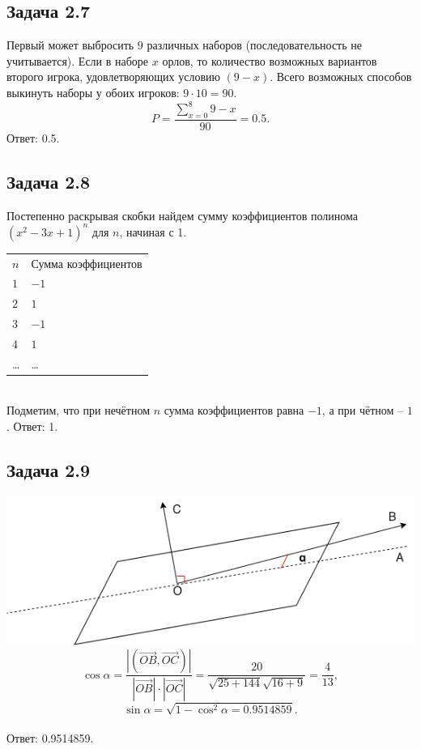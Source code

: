 \documentclass[12pt]{article}
\begin{document}
\subsection*{Задача 2.7}
Первый может выбросить $9$ различных наборов (последовательность не учитывается). Если в наборе $x$ орлов, то количество возможных вариантов второго игрока, удовлетворяющих условию $(9 - x)$. Всего возможных способов выкинуть наборы у обоих игроков: $9 \cdot 10 = 90$. $$P = \frac{\sum\limits_{x=0}^8{9-x}}{90}=0.5.$$
Ответ: 0.5.  
\subsection*{Задача 2.8}
Постепенно раскрывая скобки найдем сумму коэффициентов полинома $(x^2-3x+1)^n$ для $n$, начиная с 1.\\
\begin{tabular}{l l}
    $n$ & Сумма коэффициентов \\
    $1$ & $-1$  \\
    $2$ & $1$  \\
    $3$ & $-1$  \\
    $4$ & $1$  \\
    \dots & \dots \\
\end{tabular}\\
Подметим, что при нечётном $n$ сумма коэффициентов равна $-1$, а при чётном -- $1$. Ответ: 1.

\subsection*{Задача 2.9}
\includegraphics{math29}\\
$$\cos\alpha = \frac{|(\vec{OB}, \vec{OC})|}{|\vec{OB}|\cdot|\vec{OC}|} = \frac{20}{\sqrt{25+144}\sqrt{16+9}}= \frac{4}{13},$$
$$\sin\alpha = \sqrt{1 - \cos^2 \alpha = 0.9514859}.$$\\
Ответ: 0.9514859.
\end{document}
